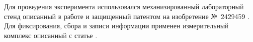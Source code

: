 Для проведения эксперимента использовался механизированный лабораторный стенд описанный в работе \cite{Sram2013Modernizaciya} и защищенный патентом на изобретение №~2429459 \cite{ExpStend}. Для фиксирования, сбора и записи информации применен измерительный комплекс описанный с статье \cite{IKI2016:my}.




	


	

